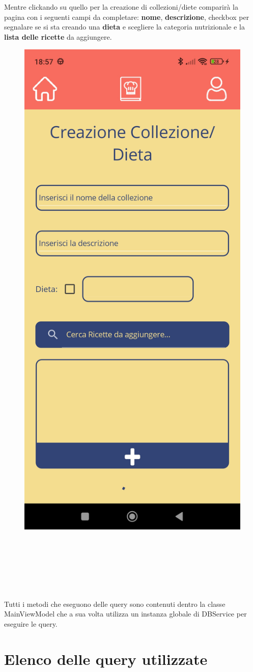 ﻿\documentclass[a4paper,12pt]{report}
\begin{document}
\\\\\\\\\\\\\\Mentre clickando su quello per la creazione di collezioni/diete comparirà la pagina con i seguenti campi da completare:
\textbf{nome}, \textbf{descrizione}, checkbox per segnalare se si sta creando una \textbf{dieta} e scegliere la categoria nutrizionale e la \textbf{lista delle ricette} da aggiungere.
\begin{figure}[h!]
    \centering
    \includegraphics[width=0.5\linewidth]{app_images/CollectionCreation.jpg}
\end{figure}
\\\\\\\\\\\\Tutti i metodi che eseguono delle query sono contenuti dentro la classe MainViewModel che a sua volta utilizza un instanza globale di DBService per eseguire le query.
\section{Elenco delle query utilizzate}
\end{document}
